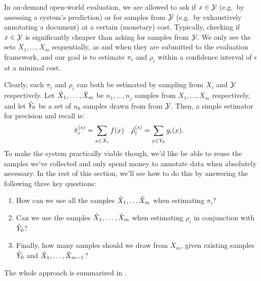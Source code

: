 In on-demand open-world evaluation, we are allowed to ask if $x \in \mathcal{Y}$ (e.g.\ by assessing a system's prediction) or for samples from $\mathcal{Y}$ (e.g.\ by exhaustively annotating a document) at a certain (monetary) cost.
Typically, checking if $x \in \mathcal{Y}$ is significantly cheaper than asking for samples from $\mathcal{Y}$.
We only see the sets $X_1, \ldots, X_m$ sequentially, as and when they are submitted to the evaluation framework, and
  our goal is to estimate $\pi_i$ and $\rho_i$ within a confidence interval of $\epsilon$ at a minimal cost. 

Clearly, each $\pi_i$ and $\rho_i$ can both be estimated by sampling from $X_i$ and $\mathcal{Y}$ respectively.
Let ${\hat{X}}_1, \ldots, {\hat{X}}_m$ be $n_1, \ldots, n_j$ samples from $X_1, \ldots, X_m$ respectively, and let ${\hat{Y}}_0$ be a set of $n_0$ samples drawn from from $\mathcal{Y}$.
Then, a simple estimator for precision and recall is:
\begin{align*}
  {\hat{\pi}}_i^{(s)} &= \sum_{x \in {\hat{X}}_i} f(x) & {\hat{\rho}}_i^{(s)} &= \sum_{x \in {\hat{Y}}_0} g_i(x).
\end{align*}
To make the system practically viable though, we'd like be able to reuse the samples we've collected and only spend money to annotate data when absolutely necessary.
In the rest of this section, we'll see how to do this by answering the following three key questions:
\begin{enumerate}
  \item How can we use all the samples ${\hat{X}}_1, \ldots {\hat{X}}_m$ when estimating $\pi_i$?
  \item Can we use the samples ${\hat{X}}_1, \ldots, {\hat{X}}_m$ when estimating $\rho_i$ in conjunction with ${\hat{Y}}_0$?
  \item Finally, how many samples should we draw from $X_m$, given existing samples ${\hat{Y}}_0$ and ${\hat{X}}_1, \ldots, {\hat{X}}_{m-1}$?
\end{enumerate}
The whole approach is summarized in .

